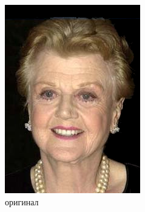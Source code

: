 \begin{figure}[t]
\centering
	\begin{subfigure}[t]{0.25\textwidth}
		\includegraphics[width=\textwidth]{gandhi/from_57_1.png}
		\caption{оригинал}
	\end{subfigure}
	\begin{subfigure}[t]{0.25\textwidth}

\end{subfigure}
\end{figure}
